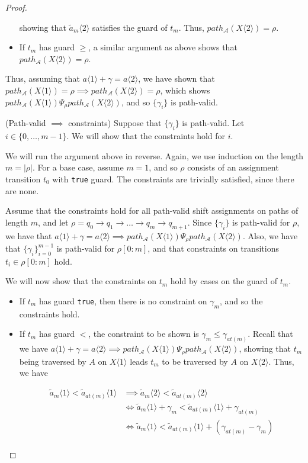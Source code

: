\documentclass{article}
\newcommand{\1}{\langle 1 \rangle}
\newcommand{\2}{\langle 2 \rangle}
\begin{document}
\begin{proof}
\begin{itemize}
        showing that $\tilde{a}_{m} \2$ satisfies the guard of $t_m$. Thus, $path_{\mathcal{A}}(X \2) = \rho$.
        \item If $t_{m}$ has guard $\geq$, a similar argument as above shows that $path_{\mathcal{A}}(X \2) = \rho$.
    \end{itemize}

    Thus, assuming that $a \1 + \gamma = a \2$, we have shown that $path_{\mathcal{A}}(X \1) = \rho \implies path_{\mathcal{A}}(X \2) = \rho$, which shows $path_{\mathcal{A}}(X \1) \Psi_\rho path_{\mathcal{A}}(X \2)$, and so $\{\gamma_i\}$ is path-valid.

    (Path-valid $\implies$ constraints) Suppose that $\{\gamma_i\}$ is path-valid. Let $i \in \{0, \dots, m - 1\}$. We will show that the constraints hold for $i$. 

    We will run the argument above in reverse. Again, we use induction on the length $m = |\rho|$. For a base case, assume $m = 1$, and so $\rho$ consists of an assignment transition $t_0$ with \texttt{true} guard. The constraints are trivially satisfied, since there are none. 

    Assume that the constraints hold for all path-valid shift assignments on paths of length $m$, and let $\rho = q_0 \to q_1 \to \dots \to q_{m} \to q_{m + 1}$. Since $\{\gamma_i\}$ is path-valid for $\rho$, we have that $a \1 + \gamma = a \2 \implies path_{\mathcal{A}}(X \1) \Psi_\rho path_{\mathcal{A}}(X \2)$. Also, we have that $\{\gamma_i\}_{i = 0}^{m - 1}$ is path-valid for $\rho[0:m]$, and that constraints on transitions $t_i \in \rho[0:m]$ hold. 

    We will now show that the constraints on $t_{m}$ hold by cases on the guard of $t_{m}$.

    \begin{itemize}
        \item If $t_{m}$ has guard \texttt{true}, then there is no constraint on $\gamma_{m}$, and so the constraints hold.
        \item If $t_{m}$ has guard $<$, the constraint to be shown is $\gamma_m \leq \gamma_{at(m)}$. Recall that we have $a \1 + \gamma = a \2 \implies path_{\mathcal{A}}(X \1) \Psi_\rho path_{\mathcal{A}}(X \2)$, showing that $t_m$ being traversed by $A$ on $X \1$ leads $t_m$ to be traversed by $A$ on $X \2$. Thus, we have 
        
        \begin{align*}
            \tilde{a}_m \1 < \tilde{a}_{at(m)} \1 &\implies \tilde{a}_m \2 < \tilde{a}_{at(m)} \2\\
             &\iff \tilde{a}_m \1 + \gamma_m < \tilde{a}_{at(m)} \1 + \gamma_{at(m)}\\
             &\iff \tilde{a}_m \1 < \tilde{a}_{at(m)} \1 + (\gamma_{at(m)} - \gamma_m)\\
        \end{align*}


\end{itemize}
\end{proof}
\end{document}
